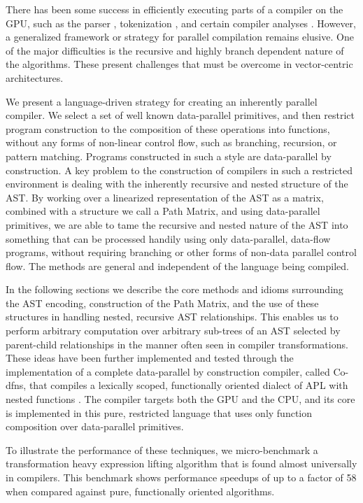 ﻿\documentclass[numbers,10pt,preprint]{sigplanconf}
\begin{document}
There has been some success in efficiently executing parts of a compiler on the GPU, such as the parser \cite{bunda1984apl}, tokenization \cite{bernecky2003tokenizer}, and certain compiler analyses \cite{prabhu2011eigencfa,mendez2012inclusion}. However, a generalized framework or strategy for parallel compilation remains elusive. One of the major difficulties is the recursive and highly branch dependent nature of the algorithms. These present challenges that must be overcome in vector-centric architectures.

We present a language-driven strategy for creating an inherently parallel compiler. We select a set of well known data-parallel primitives, and then restrict program construction to the composition of these operations into functions, without any forms of non-linear control flow, such as branching, recursion, or pattern matching. Programs constructed in such a style are data-parallel by construction. A key problem to the construction of compilers in such a restricted environment is dealing with the inherently recursive and nested structure of the AST. By working over a linearized representation of the AST as a matrix, combined with a structure we call a Path Matrix, and using data-parallel primitives, we are able to tame the recursive and nested nature of the AST into something that can be processed handily using only data-parallel, data-flow programs, without requiring branching or other forms of non-data parallel control flow. The methods are general and independent of the language being compiled.

In the following sections we describe the core methods and idioms surrounding the AST encoding, construction of the Path Matrix, and the use of these structures in handling nested, recursive AST relationships. This enables us to perform arbitrary computation over arbitrary sub-trees of an AST selected by parent-child relationships in the manner often seen in compiler transformations. These ideas have been further implemented and tested through the implementation of a complete data-parallel by construction compiler, called Co-dfns, that compiles a lexically scoped, functionally oriented dialect of APL with nested functions \cite{hsu2014co,hsu2015accelerating}. The compiler targets both the GPU and the CPU, and its core is implemented in this pure, restricted language that uses only function composition over data-parallel primitives.

To illustrate the performance of these techniques, we micro-benchmark a transformation heavy expression lifting algorithm that is found almost universally in compilers. This benchmark shows performance speedups of up to a factor of 58 when compared against pure, functionally oriented algorithms.
\end{document}
